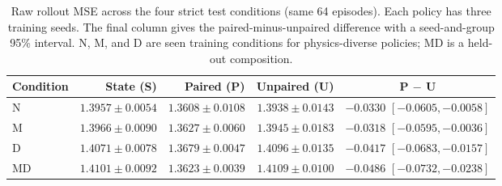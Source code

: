 \begin{table}[t]
\centering
\caption{Raw rollout MSE across the four strict test conditions (same 64 episodes). Each policy has three training seeds. The final column gives the paired-minus-unpaired difference with a seed-and-group 95\% interval. N, M, and D are seen training conditions for physics-diverse policies; MD is a held-out composition.}
\label{tab:variants}
\footnotesize
\setlength{\tabcolsep}{5pt}
\renewcommand{\arraystretch}{1.12}
\begin{tabular}{lrrrc}
\toprule
Condition & State (S) & Paired (P) & Unpaired (U) & P $-$ U \\
\midrule
N & $1.3957\pm0.0054$ & $1.3608\pm0.0108$ & $1.3938\pm0.0143$ & $-0.0330$ $[-0.0605,-0.0058]$ \\
M & $1.3966\pm0.0090$ & $1.3627\pm0.0060$ & $1.3945\pm0.0183$ & $-0.0318$ $[-0.0595,-0.0036]$ \\
D & $1.4071\pm0.0078$ & $1.3679\pm0.0047$ & $1.4096\pm0.0135$ & $-0.0417$ $[-0.0683,-0.0157]$ \\
MD & $1.4101\pm0.0092$ & $1.3623\pm0.0039$ & $1.4109\pm0.0100$ & $-0.0486$ $[-0.0732,-0.0238]$ \\
\bottomrule
\end{tabular}
\end{table}
